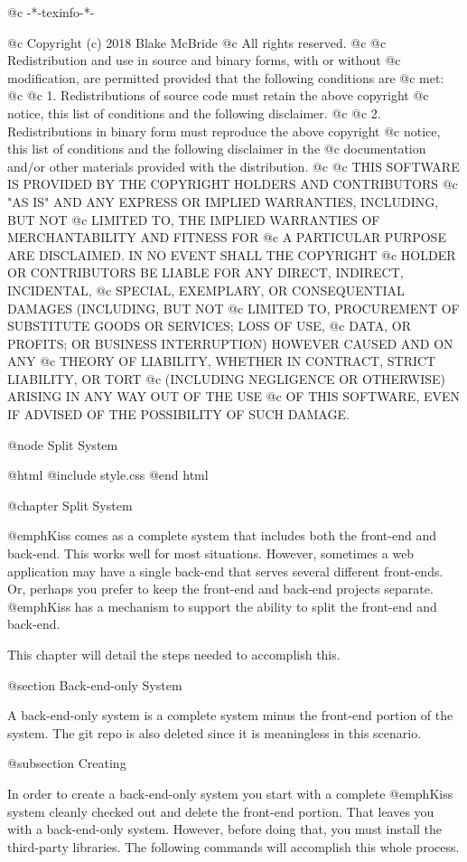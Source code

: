 @c -*-texinfo-*-

@c  Copyright (c) 2018 Blake McBride
@c  All rights reserved.
@c
@c  Redistribution and use in source and binary forms, with or without
@c  modification, are permitted provided that the following conditions are
@c  met:
@c
@c  1. Redistributions of source code must retain the above copyright
@c  notice, this list of conditions and the following disclaimer.
@c
@c  2. Redistributions in binary form must reproduce the above copyright
@c  notice, this list of conditions and the following disclaimer in the
@c  documentation and/or other materials provided with the distribution.
@c
@c  THIS SOFTWARE IS PROVIDED BY THE COPYRIGHT HOLDERS AND CONTRIBUTORS
@c  "AS IS" AND ANY EXPRESS OR IMPLIED WARRANTIES, INCLUDING, BUT NOT
@c  LIMITED TO, THE IMPLIED WARRANTIES OF MERCHANTABILITY AND FITNESS FOR
@c  A PARTICULAR PURPOSE ARE DISCLAIMED. IN NO EVENT SHALL THE COPYRIGHT
@c  HOLDER OR CONTRIBUTORS BE LIABLE FOR ANY DIRECT, INDIRECT, INCIDENTAL,
@c  SPECIAL, EXEMPLARY, OR CONSEQUENTIAL DAMAGES (INCLUDING, BUT NOT
@c  LIMITED TO, PROCUREMENT OF SUBSTITUTE GOODS OR SERVICES; LOSS OF USE,
@c  DATA, OR PROFITS; OR BUSINESS INTERRUPTION) HOWEVER CAUSED AND ON ANY
@c  THEORY OF LIABILITY, WHETHER IN CONTRACT, STRICT LIABILITY, OR TORT
@c  (INCLUDING NEGLIGENCE OR OTHERWISE) ARISING IN ANY WAY OUT OF THE USE
@c  OF THIS SOFTWARE, EVEN IF ADVISED OF THE POSSIBILITY OF SUCH DAMAGE.

@node Split System

@html
@include style.css
@end html

@chapter Split System

@emph{Kiss} comes as a complete system that includes both the front-end and back-end.
This works well for most situations.  However, sometimes a web application may have a
single back-end that serves several different front-ends.  Or, perhaps you prefer to keep
the front-end and back-end projects separate.  @emph{Kiss} has a mechanism to support the
ability to split the front-end and back-end.

This chapter will detail the steps needed to accomplish this.

@section Back-end-only System

A back-end-only system is a complete system minus the front-end portion of the system.
The git repo is also deleted since it is meaningless in this scenario.

@subsection Creating

In order to create a back-end-only system you start with a complete
@emph{Kiss} system cleanly checked out and delete the front-end
portion.  That leaves you with a back-end-only system.  However, before
doing that, you must install the third-party libraries.  The following
commands will accomplish this whole process.

